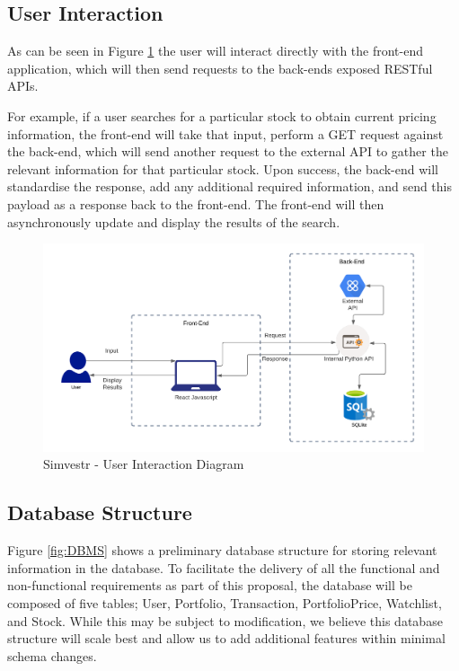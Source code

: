 \subsection{User Interaction}
As can be seen in Figure \ref{fig:Simvestr - User Interaction Diagram} the user will interact directly with the front-end application, which will then send requests to the back-ends exposed RESTful APIs. 

For example, if a user searches for a particular stock to obtain current pricing information, the front-end will take that input, perform a GET request against the back-end, which will send another request to the external API to gather the relevant information for that particular stock. Upon success, the back-end will standardise the response, add any additional required information, and send this payload as a response back to the front-end. The front-end will then asynchronously update and display the results of the search.

\begin{figure}[htp]
    \centering
    \includegraphics[scale = .7]{./5_architecture/Architecture User.png}
    \caption{Simvestr - User Interaction Diagram}
    \label{fig:Simvestr - User Interaction Diagram}
\end{figure}

\subsection{Database Structure}
Figure \ref{fig:DBMS} shows a preliminary database structure for storing relevant information in the database. To facilitate the delivery of all the functional and non-functional requirements as part of this proposal, the database will be composed of five tables; User, Portfolio, Transaction, PortfolioPrice, Watchlist, and Stock. While this may be subject to modification, we believe this database structure will scale best and allow us to add additional features within minimal schema changes.


